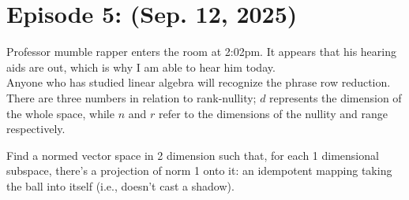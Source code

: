\section{Episode 5: (Sep. 12, 2025)}
Professor mumble rapper enters the room at 2:02pm. It appears that his hearing aids are out, which is why I am able to hear him today.
\\[8pt]
Anyone who has studied linear algebra will recognize the phrase row reduction. There are three numbers in relation to rank-nullity; $d$ represents the dimension of the whole space, while $n$ and $r$ refer to the dimensions of the nullity and range respectively.
\begin{exercise}
    Find a normed vector space in 2 dimension such that, for each 1 dimensional subspace, there's a projection of norm 1 onto it: an idempotent mapping taking the ball into itself (i.e., doesn't cast a shadow).
\end{exercise}


